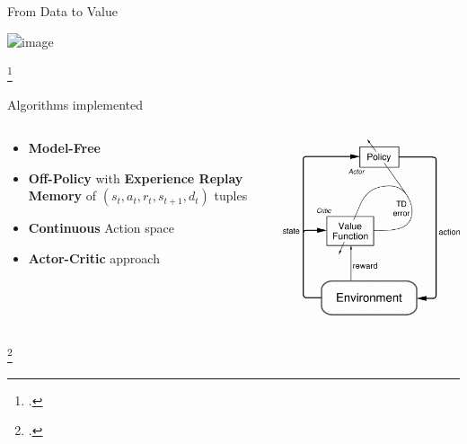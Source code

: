 \documentclass[aspectratio=169]{beamer}
\begin{document}
\begin{frame}{From Data to Value}
	\onslide<1->{}	%
	\begin{center}
		\includegraphics<1>[width=\linewidth]{img/reinforcement-learning-2.png}
	\end{center}
	\footcite*{chara2018wild}
\end{frame}

\begin{frame}{Algorithms implemented}
	\begin{columns}
		\begin{column}{0.5\linewidth}
			\begin{itemize} %
				\item \textbf{Model-Free}
				\item \textbf{Off-Policy} with \textbf{Experience Replay Memory} of $(s_t, a_t, r_t, s_{t+1}, d_t)$ tuples
				\item \textbf{Continuous} Action space
				\item \textbf{Actor-Critic} approach
			\end{itemize}
		\end{column}
		\begin{column}{0.5\linewidth}
			\centering
			\includegraphics[width=0.8\linewidth]{img/actor_critic.png}
		\end{column}
	\end{columns}
	\footcite*{sutton2018reinforcement}

\end{frame}
\end{document}
